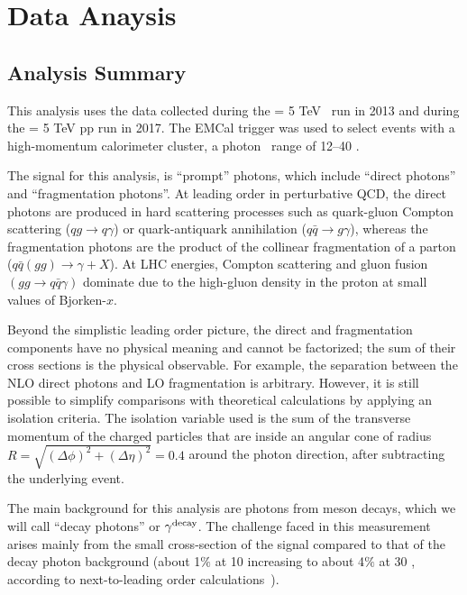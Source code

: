% 







\chapter{Data Anaysis}
\section{Analysis Summary}
This analysis uses the data collected during the \sqrtsNN{} = 5 TeV \pPb~run in 2013 and during the \sqrts{} = 5 TeV pp run in 2017. The EMCal trigger was used to select events with a high-momentum calorimeter cluster, a photon \pt~range of {12--40 \GeVc}.%

The signal for this analysis, is ``prompt'' photons, which include ``direct photons'' and ``fragmentation photons''. At leading order in perturbative QCD, the direct photons are produced in hard scattering processes such as quark-gluon Compton scattering ($qg\to q\gamma$) or quark-antiquark annihilation ($q\bar{q}\to g\gamma$), whereas the fragmentation photons are the product of the collinear fragmentation of a parton ($q\bar{q}(gg)\to \gamma + X$). At LHC energies, Compton scattering and gluon fusion $(gg\to  q\bar{q}\gamma)$ dominate due to the high-gluon density in the proton at small values of Bjorken-$x$. 

Beyond the simplistic leading order picture, the direct and fragmentation components have no physical meaning and cannot be factorized; the sum of their cross sections is the physical observable. For example, the separation between the NLO direct photons and LO fragmentation is arbitrary. However, it is still possible to simplify comparisons with theoretical calculations by applying an isolation criteria. The isolation variable used is the sum of the transverse momentum of the charged particles that are inside an angular cone of radius $R =\sqrt{(\Delta\phi)^{2} +(\Delta\eta)^{2}  } =0.4$ around the photon direction, after subtracting the underlying event. 

The main background for this analysis are photons from meson decays, which we will call ``decay photons'' or $\gamma^\mathrm{decay}$. The  challenge faced in this measurement arises mainly from the small cross-section of the signal compared to that of the decay photon background (about 1$\%$ at {10 \GeVc} increasing to about 4$\%$ at {30 \GeVc}, according to next-to-leading order calculations~\cite{Arleo:2004gn}). 

